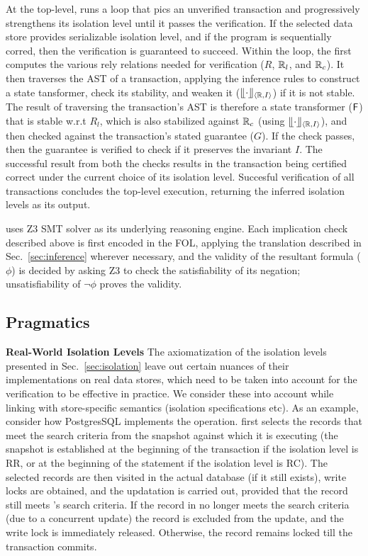 At the top-level, \tool runs a loop that pics an unverified
transaction and progressively strengthens its isolation level until it
passes the verification. If the selected data store provides
serializable isolation level, and if the program is sequentially
corred, then the verification is guaranteed to succeed. Within the
loop, the \tool first computes the various rely relations needed for
verification ($R$, $\mathbb{R}_l$, and $\mathbb{R}_c$). It then traverses the AST of a
transaction, applying the inference rules to construct a state
tansformer, check its stability, and weaken it ($\llfloor \cdot \rrfloor_{\langle \mathbb{R},I \rangle}$)
if it is not stable. The result of traversing the transaction's AST is
therefore a state transformer (${\sf F}$) that is stable w.r.t $R_l$, which
is also stabilized against $\mathbb{R}_c$ (using $\llfloor \cdot \rrfloor_{\langle \mathbb{R},I \rangle}$), and
then checked against the transaction's stated guarantee ($G$). If the
check passes, then the guarantee is verified to check if it preserves
the invariant $I$. The successful result from both the checks results
in the transaction being certified correct under the current choice of
its isolation level. Succesful verification of all transactions
concludes the top-level execution, returning the inferred isolation
levels as its output.

\tool uses Z3 SMT solver as its underlying reasoning engine. Each
implication check described above is first encoded in the FOL,
applying the translation described in Sec.~\ref{sec:inference}
wherever necessary, and the validity of the resultant formula ($\phi$)
is decided by asking Z3 to check the satisfiability of its negation;
unsatisfiability of $\neg\phi$ proves the validity.

\subsection{Pragmatics}

\textbf{Real-World Isolation Levels} The axiomatization of the
isolation levels presented in Sec.~\ref{sec:isolation} leave out
certain nuances of their implementations on real data stores, which
need to be taken into account for the verification to be effective in
practice.  We consider these into account while linking \tool with
store-specific semantics (isolation specifications etc). As an
example, consider how PostgresSQL implements the  operation.
 first selects the records that meet the search criteria
from the snapshot against which it is executing (the snapshot is
established at the beginning of the transaction if the isolation level
is RR, or at the beginning of the  statement if the
isolation level is RC). The selected records are then visited in the
actual database (if it still exists), write locks are obtained, and
the updatation is carried out, provided that the record still meets
's search criteria. If the record in no longer meets the
search criteria (due to a concurrent update) the record is excluded
from the update, and the write lock is immediately released.
Otherwise, the record remains locked till the transaction commits. 

